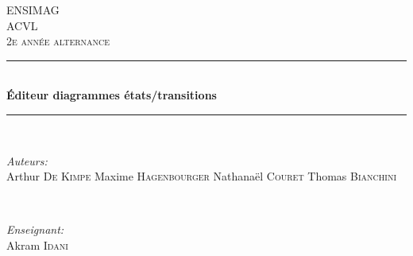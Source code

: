 \newcommand{\HRule}{\rule{\linewidth}{0.5mm}} %

\begin{center} %


\textsc{\LARGE ENSIMAG}\\[1.5cm] %
\textsc{\Large ACVL}\\[0.5cm] %
\textsc{\large 2e année alternance}\\[0.5cm] %


\HRule \\[0.4cm]
{ \huge \bfseries Éditeur diagrammes états/transitions}\\[0.4cm] %
\HRule \\[1.5cm]


\begin{minipage}{0.4\textwidth}
\begin{flushleft} \large
\emph{Auteurs:}\\
Arthur \textsc{De Kimpe}
Maxime \textsc{Hagenbourger}
Nathanaël \textsc{Couret}
Thomas \textsc{Bianchini}
\end{flushleft}
\end{minipage}
~
\begin{minipage}{0.4\textwidth}
\begin{flushright} \large
\emph{Enseignant:} \\
Akram \textsc{Idani} %
\end{flushright}
\end{minipage}\\[2cm]



\end{center}
